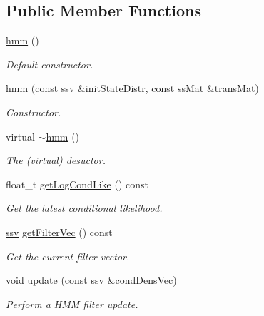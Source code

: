 \subsection*{Public Member Functions}
\begin{DoxyCompactItemize}
\item 
\hyperlink{classhmm_ad3dc1fd2d297d6da8c58b2d5075e561c}{hmm} ()
\begin{DoxyCompactList}\small\item\em Default constructor. \end{DoxyCompactList}\item 
\hyperlink{classhmm_a51696b4e5a92c56c589b5e9522115994}{hmm} (const \hyperlink{classcf__filter_ad4bce534d6b7a494dae851846037c94b}{ssv} \&init\+State\+Distr, const \hyperlink{classhmm_ab954b8e3fc86a60201ec33f371a241aa}{ss\+Mat} \&trans\+Mat)
\begin{DoxyCompactList}\small\item\em Constructor. \end{DoxyCompactList}\item 
\mbox{\label{classhmm_ab22e0359030d40feb7f17f56261152c9}} 
virtual \hyperlink{classhmm_ab22e0359030d40feb7f17f56261152c9}{$\sim$hmm} ()
\begin{DoxyCompactList}\small\item\em The (virtual) desuctor. \end{DoxyCompactList}\item 
float\+\_\+t \hyperlink{classhmm_a588f2aed002614e75f523213eba1b290}{get\+Log\+Cond\+Like} () const
\begin{DoxyCompactList}\small\item\em Get the latest conditional likelihood. \end{DoxyCompactList}\item 
\hyperlink{classcf__filter_ad4bce534d6b7a494dae851846037c94b}{ssv} \hyperlink{classhmm_a670de13d08520008774ee31b3712b5b5}{get\+Filter\+Vec} () const
\begin{DoxyCompactList}\small\item\em Get the current filter vector. \end{DoxyCompactList}\item 
void \hyperlink{classhmm_a5a25f1d14b38f0fae35a9072cfa0a368}{update} (const \hyperlink{classcf__filter_ad4bce534d6b7a494dae851846037c94b}{ssv} \&cond\+Dens\+Vec)
\begin{DoxyCompactList}\small\item\em Perform a H\+MM filter update. \end{DoxyCompactList}\end{DoxyCompactItemize}
